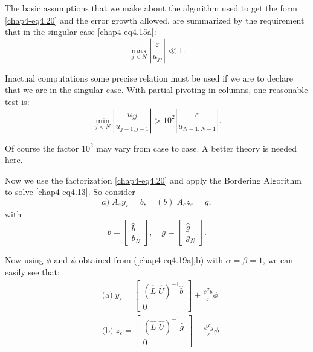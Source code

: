 The basic assumptions that we make about the algorithm used to get the
form \eqref{chap4-eq4.20} and the error  growth allowed, are
summarized by the requirement that in the singular case
\eqref{chap4-eq4.15a}:  
$$
\max_{j<N} \left|\frac{\varepsilon }{u_{jj}}\right|\ll 1. 
$$

In\pageoriginale actual computations some precise relation must be
used if we are to 
declare that we are in the singular case. With partial pivoting in
columns, one reasonable test is: 
$$
\min_{j<N}\left|\frac{u_{jj}}{u_{j-1, j-1}}\right|> 10^2\left|
\frac{\varepsilon }{u_{N-1, N-1}}\right|. 
$$

Of course the factor $10^2$  may vary from case to case. A better
theory is needed here. 

Now we use the factorization \eqref{chap4-eq4.20} and apply the Bordering
Algorithm to solve \eqref{chap4-eq4.13}. So consider 
\begin{equation*}
a) \;  A_\varepsilon  y_\varepsilon  =b , \quad (b) \; A_\varepsilon  z_
\varepsilon  =g, \tag{4.21}\label{chap4-eq4.21} 
\end{equation*}
with 
$$
b= 
\begin{bmatrix}
\hat{b}\\
b_N 
\end{bmatrix}
, \quad g=
\begin{bmatrix}
\hat{g}\\
g_N
\end{bmatrix}.
$$

Now using $\phi $ and $\psi$ obtained from (\ref{chap4-eq4.19a},b)
with $ \alpha = \beta = 1$, we can easily see that: 
\begin{equation*}
\begin{split}
& \text{(a)} \; 	 y_\varepsilon =
\begin{bmatrix}
(\hat{L} \; \hat{U})^{-1} \hat{b}\\
0
\end{bmatrix}
+\frac{\psi ^T b}{\varepsilon } \phi\\
& \text{(b)} \;  z_\varepsilon =
\begin{bmatrix}
(\hat{L} \; \hat{U})^{-1}\hat{g}\\
0
\end{bmatrix}
+\frac{\psi ^T g}{\varepsilon }\phi 
\end{split}\tag{4.22}\label{chap4-eq4.22}
\end{equation*}

